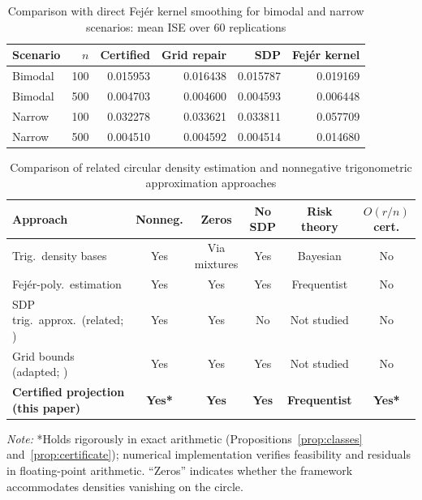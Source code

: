 \begin{table}[htbp]
\centering
\caption{Comparison with direct Fejér kernel smoothing for bimodal and narrow scenarios: mean ISE over 60 replications}\label{tab:t3}
\small
\begin{tabular}{lrrrrr}
\toprule
Scenario & \(n\) & Certified & Grid repair & SDP & Fejér kernel \\
\midrule
Bimodal & 100 & 0.015953 & 0.016438 & 0.015787 & 0.019169 \\
Bimodal & 500 & 0.004703 & 0.004600 & 0.004593 & 0.006448 \\
Narrow & 100 & 0.032278 & 0.033621 & 0.033811 & 0.057709 \\
Narrow & 500 & 0.004510 & 0.004592 & 0.004514 & 0.014680 \\
\bottomrule
\end{tabular}
\end{table}

\begin{table}[htbp]
\centering
\caption{Comparison of related circular density estimation and nonnegative trigonometric approximation approaches}\label{tab:compare}
\footnotesize
\setlength{\tabcolsep}{4pt}
\begin{tabularx}{\textwidth}{>{\raggedright\arraybackslash}Xccccc}
\toprule
Approach & Nonneg. & Zeros & No SDP & Risk theory & \(O(r/n)\) cert. \\
\midrule
Trig.\ density bases \citep{binette2022} & Yes & Via mixtures & Yes & Bayesian & No \\
Fejér-poly.\ estimation \citep{klar2025} & Yes & Yes & Yes & Frequentist & No \\
SDP trig.\ approx.\ (related; \citealp{siem2008}) & Yes & Yes & No & Not studied & No \\
Grid bounds (adapted; \citealp{pfister2019}) & Yes & Yes & Yes & Not studied & No \\
\textbf{Certified projection (this paper)} & \textbf{Yes*} & \textbf{Yes} & \textbf{Yes} & \textbf{Frequentist} & \textbf{Yes*} \\
\bottomrule
\end{tabularx}

\vspace{0.3em}
\footnotesize\textit{Note:} *Holds rigorously in exact arithmetic (Propositions~\ref{prop:classes} and~\ref{prop:certificate}); numerical implementation verifies feasibility and residuals in floating-point arithmetic. ``Zeros'' indicates whether the framework accommodates densities vanishing on the circle.
\end{table}

